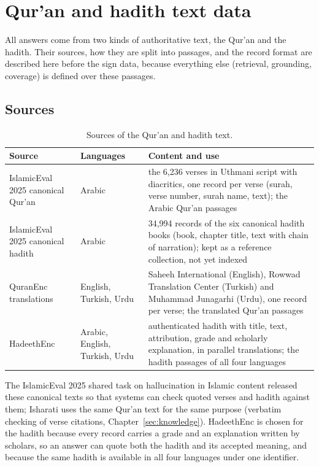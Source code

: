 \section{Qur'an and hadith text data}
\label{sec:textdata}
All answers come from two kinds of authoritative text, the Qur'an and the hadith. Their sources, how they are split
into passages, and the record format are described here before the sign data, because everything else (retrieval,
grounding, coverage) is defined over these passages.

\subsection{Sources}
\begin{table}[ht]
\centering\small
\caption{Sources of the Qur'an and hadith text.}
\label{tab:textsources}
\begin{tabularx}{\textwidth}{L{3.4cm} L{1.9cm} Y}
\toprule
Source & Languages & Content and use \\
\midrule
IslamicEval 2025 canonical Qur'an \cite{islamiceval} & Arabic & the 6,236 verses in Uthmani script with diacritics, one
record per verse (surah, verse number, surah name, text); the Arabic Qur'an passages \\
IslamicEval 2025 canonical hadith \cite{islamiceval} & Arabic & 34,994 records of the six canonical hadith books
(book, chapter title, text with chain of narration); kept as a reference collection, not yet indexed \\
QuranEnc translations \cite{quranenc} & English, Turkish, Urdu & Saheeh International (English), Rowwad Translation Center
(Turkish) and Muhammad Junagarhi (Urdu), one record per verse; the translated Qur'an passages \\
HadeethEnc \cite{hadeethenc} & Arabic, English, Turkish, Urdu & authenticated hadith with title, text, attribution,
grade and scholarly explanation, in parallel translations; the hadith passages of all four languages \\
\bottomrule
\end{tabularx}
\end{table}

The IslamicEval 2025 shared task on hallucination in Islamic content \cite{islamiceval} released these canonical texts
so that systems can check quoted verses and hadith against them; Isharati uses the same Qur'an text for the same purpose
(verbatim checking of verse citations, Chapter~\ref{sec:knowledge}). HadeethEnc is chosen for the hadith because every
record carries a grade and an explanation written by scholars, so an answer can quote both the hadith and its accepted
meaning, and because the same hadith is available in all four languages under one identifier.

